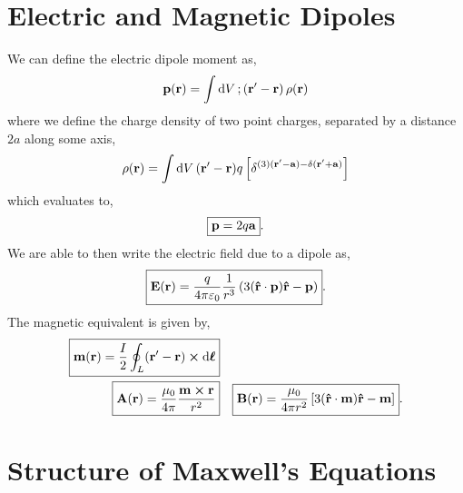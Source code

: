 \documentclass{book}
\begin{document}
\section{Electric and Magnetic Dipoles}
We can define the electric dipole moment as,
\begin{equation}
	\vb{p}(\vb{r}) = \int\dd{V};\left(\vb{r}'-\vb{r}\right)\rho(\vb{r})
\end{equation}
where we define the charge density of two point charges, separated by a distance $2a$ along some axis,
\begin{equation}
	\rho(\vb{r}) = \int\dd{V}(\vb{r}'-\vb{r})q\left[\delta^{(3)(\vb{r}'-\vb{a}) - \delta(\vb{r}'+\vb{a})}\right]
\end{equation}
which evaluates to,
\begin{equation}
	\boxed{\vb{p} = 2q\vb{a}}.
\end{equation}
We are able to then write the electric field due to a dipole as,
\begin{equation}
	\boxed{\vb{E}(\vb{r})  = \frac{q}{4\pi \varepsilon_0} \frac{1}{r^3}\left(3(\vu{r}\cdot\vb{p})\vu{r} - \vb{p}\right)}.
\end{equation}
The magnetic equivalent is given by,
\begin{align}
	\boxed{ \vb{m}(\vb{r}) = \frac{I}{2} \oint_L (\vb{r}' - \vb{r})\cross \dd{\vb*{\ell}} } \\
	\boxed{ \vb{A}(\vb{r}) = \frac{\mu_0}{4\pi}\frac{\vb{m} \cross \vb{r}}{r^2} } && \boxed{ \vb{B}(\vb{r}) = \frac{\mu_0}{4\pi r^2}\left[3(\vu{r}\cdot{\vb{m}})\vu{r}-\vb{m}\right] }.
\end{align}
\section{Structure of Maxwell's Equations}
\end{document}
